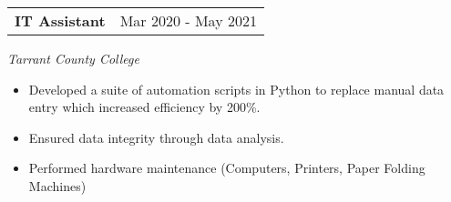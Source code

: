 \documentclass[a4paper,12pt]{article}
\begin{document}
\begin{tabularx}{\linewidth}{@{}Xr@{}}
\textbf{IT Assistant} & \hfill Mar 2020 - May 2021
\end{tabularx}
\textit{Tarrant County College}
\begin{itemize}[leftmargin=*, nosep]
    \item Developed a suite of automation scripts in Python to replace manual data entry which increased efficiency by 200\%.
    \item Ensured data integrity through data analysis.
    \item Performed hardware maintenance (Computers, Printers, Paper Folding Machines)
\end{itemize}
\vfill
\end{document}
